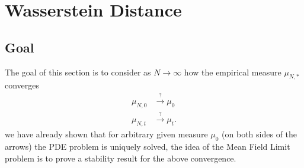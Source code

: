 \section{Wasserstein Distance}
\subsection{Goal}
The goal of this section is to consider  as $N \to  \infty$ how the empirical measure $\mu_{N,*}$ converges 
\begin{align*}
  \mu_{N,0} &\xrightarrow{?} \mu_0 \\
  \mu_{N,t} &\xrightarrow{?} \mu_t
.\end{align*}
we have already shown that for arbitrary given measure $\mu_0$ (on both sides of the arrows)  the PDE problem is uniquely solved,
the idea of the Mean Field Limit problem is to prove a stability result for the above convergence.
